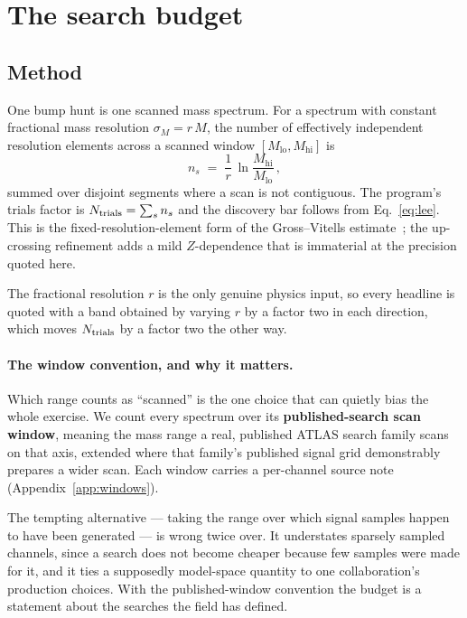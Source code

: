 \section{The search budget}
\label{sec:budget}

\subsection{Method}

One bump hunt is one scanned mass spectrum. For a spectrum with constant fractional mass resolution
$\sigma_M = r\,M$, the number of effectively independent resolution elements across a scanned
window $[M_{\mathrm{lo}}, M_{\mathrm{hi}}]$ is
\begin{equation}
  n_s \;=\; \frac{1}{r}\,\ln\!\frac{M_{\mathrm{hi}}}{M_{\mathrm{lo}}}\,,
  \label{eq:ns}
\end{equation}
summed over disjoint segments where a scan is not contiguous. The program's trials factor is
$N_{\mathrm{trials}} = \sum_s n_s$ and the discovery bar follows from Eq.~\eqref{eq:lee}. This is the
fixed-resolution-element form of the Gross--Vitells estimate~\cite{grossvitells}; the up-crossing
refinement adds a mild $Z$-dependence that is immaterial at the precision quoted here.

The fractional resolution $r$ is the only genuine physics input, so every headline is quoted with
a band obtained by varying $r$ by a factor two in each direction, which moves $N_{\mathrm{trials}}$ by a factor
two the other way.

\paragraph{The window convention, and why it matters.} Which range counts as ``scanned'' is the
one choice that can quietly bias the whole exercise. We count every spectrum over its
\textbf{published-search scan window}, meaning the mass range a real, published ATLAS search
family scans on that axis, extended where that family's published signal grid demonstrably
prepares a wider scan. Each window carries a per-channel source note
(Appendix~\ref{app:windows}).

The tempting alternative --- taking the range over which signal samples happen to have been
generated --- is wrong twice over. It understates sparsely sampled channels, since a search does
not become cheaper because few samples were made for it, and it ties a supposedly model-space
quantity to one collaboration's production choices. With the published-window convention the
budget is a statement about the searches the field has defined.

